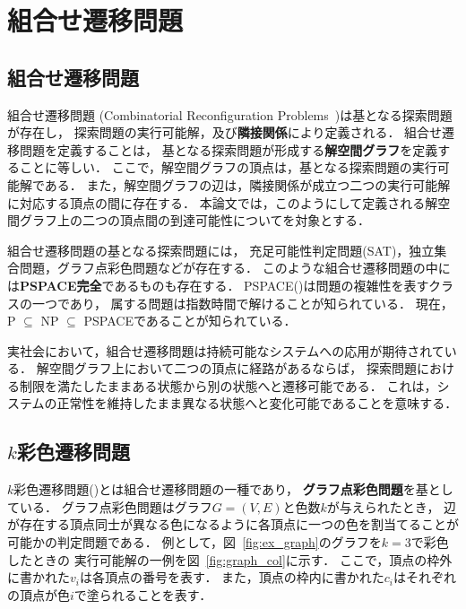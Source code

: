 \chapter{組合せ遷移問題} \label{chap:background}

\section{組合せ遷移問題}
組合せ遷移問題 (Combinatorial Reconfiguration Problems~\cite{Ito18:tohoku})は基となる探索問題が存在し，
探索問題の実行可能解，及び\textbf{隣接関係}により定義される．
組合せ遷移問題を定義することは，
基となる探索問題が形成する\textbf{解空間グラフ}を定義することに等しい．
ここで，解空間グラフの頂点は，基となる探索問題の実行可能解である． 
また，解空間グラフの辺は，隣接関係が成立つ二つの実行可能解に対応する頂点の間に存在する．
本論文では，このようにして定義される解空間グラフ上の二つの頂点間の到達可能性についてを対象とする．

組合せ遷移問題の基となる探索問題には，
充足可能性判定問題(SAT)，独立集合問題，グラフ点彩色問題などが存在する．
このような組合せ遷移問題の中には\textbf{PSPACE完全}であるものも存在する． 
PSPACE(\cite{Kuriyama13:ieice})は問題の複雑性を表すクラスの一つであり，
属する問題は指数時間で解けることが知られている． 
現在，P $\subseteq$ NP $\subseteq$ PSPACEであることが知られている．

実社会において，組合せ遷移問題は持続可能なシステムへの応用が期待されている． 
解空間グラフ上において二つの頂点に経路があるならば，
探索問題における制限を満たしたままある状態から別の状態へと遷移可能である． 
これは，システムの正常性を維持したまま異なる状態へと変化可能であることを意味する．

\section{$k$彩色遷移問題}
$k$彩色遷移問題(\cite{BC2009:tcs})とは組合せ遷移問題の一種であり，
\textbf{グラフ点彩色問題}を基としている． 
グラフ点彩色問題はグラフ$G=(V, E)$と色数$k$が与えられたとき，
辺が存在する頂点同士が異なる色になるように各頂点に一つの色を割当てることが可能かの判定問題である． 
例として，図~\ref{fig:ex_graph}のグラフを$k=3$で彩色したときの
実行可能解の一例を図~\ref{fig:graph_col}に示す． 
ここで，頂点の枠外に書かれた$v_i$は各頂点の番号を表す．
また，頂点の枠内に書かれた$c_i$はそれぞれの頂点が色$i$で塗られることを表す．

